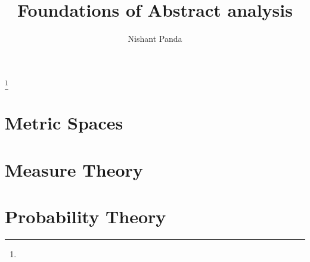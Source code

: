 \documentclass{gsm-l}
\begin{document}
\frontmatter

\title{Foundations of Abstract analysis}

\author{Nishant Panda}
\address{2451 S. Timberline Rd, Apt 4, Fort Collins, Co 80525}
\curraddr{}
\thanks{}



\maketitle
\setcounter{page}{5}
\tableofcontents

%

\mainmatter{}
\part{Metric Spaces}

\part{Measure Theory}




\part{Probability Theory}



\appendix


\backmatter{}
%
%

\printindex
\end{document}
